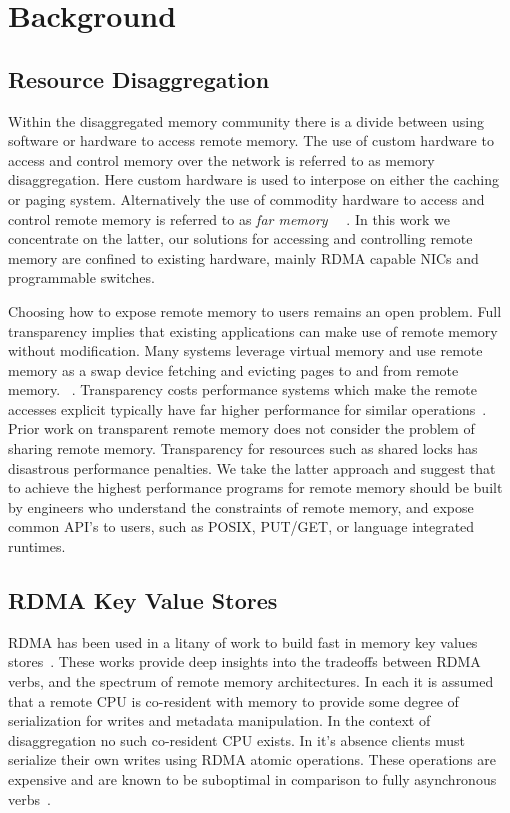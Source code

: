 \section{Background}


\subsection{Resource Disaggregation}


Within the disaggregated memory community there is a divide between using
software or hardware to access remote memory.  The use of custom hardware to
access and control memory over the network is referred to as memory
disaggregation. Here custom hardware is used to interpose on either the caching
or paging system. Alternatively the use of commodity hardware to access and
control remote memory is referred to as \textit{far memory} ~\cite{reigons,
legoos, clover}~. In this work we concentrate on the latter, our
solutions for accessing and controlling remote memory are confined to existing
hardware, mainly RDMA capable NICs and programmable switches.

Choosing how to expose remote memory to users remains an open problem. Full
transparency implies that existing applications can make use of remote memory
without modification. Many systems leverage virtual memory and use remote memory
as a swap device fetching and evicting pages to and from remote memory.
~\cite{fastswap,GMS,infiniswap,leap}. Transparency costs performance systems
which make the remote accesses explicit typically have far higher performance
for similar operations~\cite{aifm}.
Prior work on transparent remote memory does not consider the problem of sharing
remote memory. Transparency for resources such as shared locks has disastrous
performance penalties.  We take the latter approach and suggest that to achieve
the highest performance programs for remote memory should be built by engineers
who understand the constraints of remote memory, and expose common API's to
users, such as POSIX, PUT/GET, or language integrated runtimes.

\subsection{RDMA Key Value Stores}

RDMA has been used in a litany of work to build fast in memory key values
stores~\cite{MemC3,herd,pilaf,sonuma,storm}. These works provide deep insights
into the tradeoffs between RDMA verbs, and the spectrum of remote memory
architectures. In each it is assumed that a remote CPU is co-resident with
memory to provide some degree of serialization for writes and metadata
manipulation. In the context of disaggregation no such co-resident CPU exists.
In it's absence clients must serialize their own writes using RDMA atomic
operations. These operations are expensive and are known to be suboptimal in
comparison to fully asynchronous verbs~\cite{design-guidelines}.

